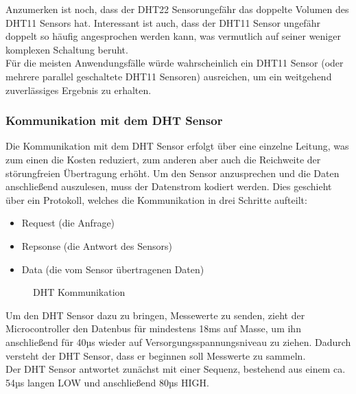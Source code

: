 Anzumerken ist noch, dass der DHT22 Sensorungefähr das doppelte Volumen des DHT11 Sensors hat. Interessant ist auch, dass der DHT11 Sensor ungefähr doppelt so häufig angesprochen werden kann, was vermutlich auf seiner weniger komplexen Schaltung beruht.\\
Für die meisten Anwendungsfälle würde wahrscheinlich ein DHT11 Sensor (oder mehrere parallel geschaltete DHT11 Sensoren) ausreichen, um ein weitgehend zuverlässiges Ergebnis zu erhalten.

\subsubsection{Kommunikation mit dem DHT Sensor} 

Die Kommunikation mit dem DHT Sensor erfolgt über eine einzelne Leitung, was zum einen die Kosten reduziert, zum anderen aber auch die Reichweite der störungfreien Übertragung erhöht. Um den Sensor anzusprechen und die Daten anschließend auszulesen, muss der Datenstrom kodiert werden. Dies geschieht über ein Protokoll, welches die Kommunikation in drei Schritte aufteilt:
\begin{itemize} 
	\item Request (die Anfrage)
	\item Repsonse (die Antwort des Sensors)
	\item Data (die vom Sensor übertragenen Daten)
\end{itemize}


\begin{center}
	\begin{figure}[h]
	 
	 \noindent{}
	 \caption[DHT Kommunikation]{DHT Kommunikation}
	 \label{fig:dhtkommunikation}
	\end{figure}
\end{center}


Um den DHT Sensor dazu zu bringen, Messewerte zu senden, zieht der Microcontroller den Datenbus für mindestens 18ms auf Masse, um ihn anschließend für 40µs wieder auf Versorgungsspannungsniveau zu ziehen. Dadurch versteht der DHT Sensor, dass er beginnen soll Messwerte zu sammeln.\\
Der DHT Sensor antwortet zunächst mit einer Sequenz, bestehend aus einem ca. 54µs langen LOW und anschließend 80µs HIGH. 

